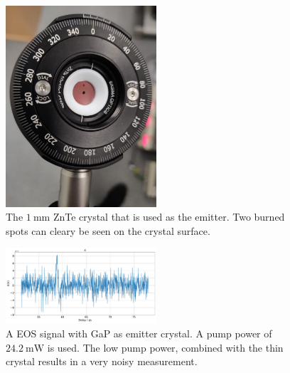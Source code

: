 \begin{figure}
    \centering
    \includegraphics[width=0.5\textwidth]{Plots/burned_crystal.jpeg}
    \caption{The $\SI{1}{\milli\meter}$ ZnTe crystal that is used as the emitter.
    Two burned spots can cleary be seen on the crystal surface.}
    \label{fig:ZnTe_burned}
\end{figure}

\begin{figure}
    \centering
    \includegraphics[width=0.5\textwidth]{Plots/GaP14_20_20normalX.pdf}
    \caption{A EOS signal with GaP as emitter crystal. A pump power of $\SI{24.2}{\milli\W}$ is used.
    The low pump power, combined with the thin crystal results in a very noisy measurement.}
    \label{fig:GaP_noise}
\end{figure}
